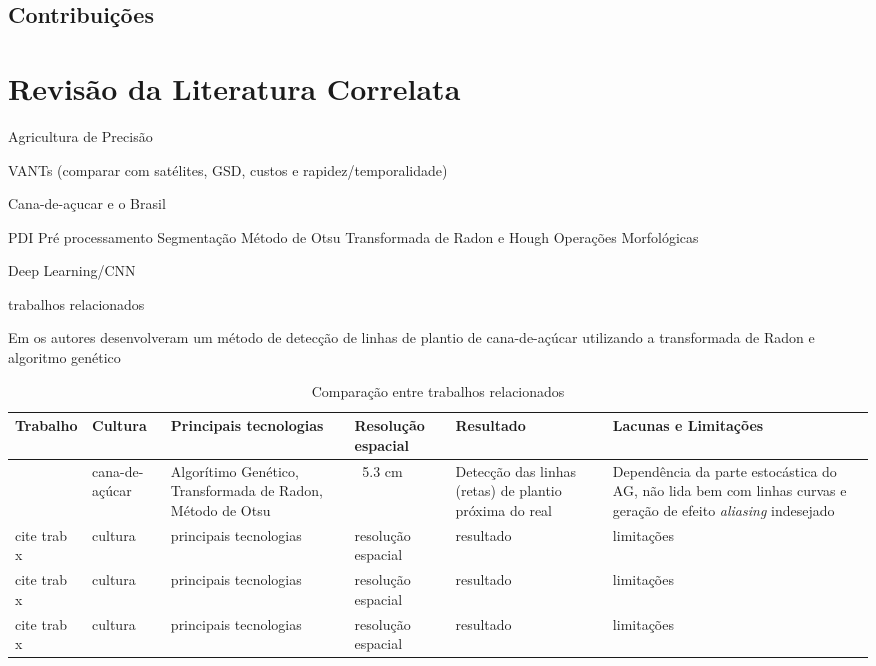 \documentclass[12pt, a4paper, english, brazil]{article}
\newcommand{\textRed}[1]{{{\color{red} #1 }}}
\begin{document}
\subsection{Contribuições}

\section{Revisão da Literatura Correlata}
Agricultura de Precisão

VANTs (comparar com satélites, GSD, custos e rapidez/temporalidade)

Cana-de-açucar e o Brasil

PDI
    Pré processamento
    Segmentação
    Método de Otsu
    Transformada de Radon e Hough
    Operações Morfológicas

Deep Learning/CNN


\bigskip
\textRed{trabalhos relacionados}
\bigskip
    
    Em  os autores desenvolveram um método de detecção de linhas de plantio de cana-de-açúcar utilizando a transformada de Radon e algoritmo genético

\begin{landscape}
\begin{table}
\centering
\caption{Comparação entre trabalhos relacionados}
\label{tab:trab_rela}
\begin{tabularx}{\linewidth}{|L|L|L|L|L|L|} 
\hline
\textbf{Trabalho} & \textbf{Cultura} & \textbf{Principais tecnologias} & \textbf{Resolução espacial} & \textbf{Resultado} & \textbf{Lacunas e Limitações} \\ \hline
\cite{Silva_Escarpinati_Backes_2021} & cana-de-açúcar & Algorítimo Genético, Transformada de Radon, Método de Otsu & $~$ 5.3 cm & Detecção das linhas (retas) de plantio próxima do real & Dependência da parte estocástica do AG, não lida bem com linhas curvas e geração de efeito \textit{aliasing} indesejado \\ \hline
cite trab x & cultura & principais tecnologias & resolução espacial & resultado & limitações \\ \hline
cite trab x & cultura & principais tecnologias & resolução espacial & resultado & limitações \\ \hline
cite trab x & cultura & principais tecnologias & resolução espacial & resultado & limitações \\ \hline
\end{tabularx}
\end{table}
\end{landscape}
\end{document}
